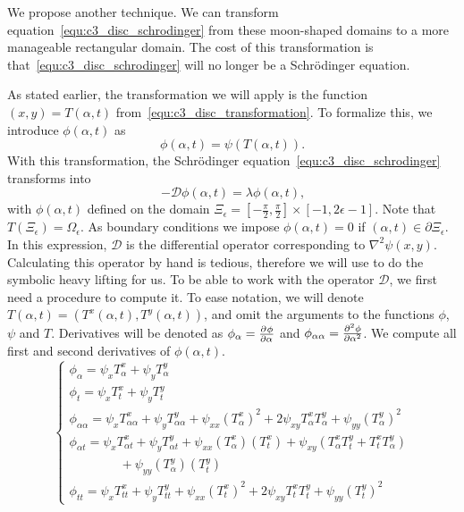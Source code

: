 We propose another technique. We can transform equation~\eqref{equ:c3_disc_schrodinger} from these moon-shaped domains to a more manageable rectangular domain. The cost of this transformation is that~\eqref{equ:c3_disc_schrodinger} will no longer be a Schrödinger equation.

As stated earlier, the transformation we will apply is the function $(x, y) = T(\alpha, t)$ from~\eqref{equ:c3_disc_transformation}. To formalize this, we introduce $\phi(\alpha, t)$ as
$$
  \phi(\alpha, t) = \psi(T(\alpha, t))\text{.}
$$
With this transformation, the Schrödinger equation~\eqref{equ:c3_disc_schrodinger} transforms into
\begin{equation}\label{equ:c3_disc_schrodinger_transformed}
  -\mathcal{D}\phi(\alpha, t) = \lambda\phi(\alpha, t)\text{,}
\end{equation}
with $\phi(\alpha, t)$ defined on the domain $\Xi_\epsilon = \left[-\frac{\pi}{2}, \frac{\pi}{2}\right] \times [-1, 2\epsilon - 1]$. Note that $T(\Xi_\epsilon) = \Omega_\epsilon$. As boundary conditions we impose $\phi(\alpha, t) = 0$ if $(\alpha, t) \in \partial\Xi_\epsilon$. In this expression, $\mathcal{D}$ is the differential operator corresponding to $\nabla^2\psi(x, y)$. Calculating this operator by hand is tedious, therefore we will use \sage{} to do the symbolic heavy lifting for us. To be able to work with the operator $\mathcal{D}$, we first need a procedure to compute it. To ease notation, we will denote $T(\alpha, t) = (T^{x}(\alpha, t), T^{y}(\alpha, t))$, and omit the arguments to the functions $\phi$, $\psi$ and $T$. Derivatives will be denoted as $\phi_\alpha = \pdv[]{\phi}{\alpha}$ and $\phi_{\alpha\alpha} = \pdv[2]{\phi}{\alpha}$. We compute all first and second derivatives of $\phi(\alpha, t)$.
\begin{equation}\label{equ:disc_transformation_derivatives}
  \begin{cases}
    \phi_\alpha = \psi_x T^x_\alpha + \psi_y T^y_\alpha                                                                                                                   \\
    \phi_t = \psi_x T^x_t + \psi_y T^y_t                                                                                                                                  \\
    \phi_{\alpha\alpha} = \psi_x T^x_{\alpha\alpha} + \psi_y T^y_{\alpha\alpha} + \psi_{xx} (T^x_\alpha)^2 + 2 \psi_{xy} T^x_\alpha T^y_\alpha + \psi_{yy} (T^y_\alpha)^2 \\
    \phi_{\alpha t} = \psi_x T^x_{\alpha t} + \psi_y T^y_{\alpha t} + \psi_{xx} (T^x_\alpha)(T^x_t) + \psi_{xy} \left(T^x_\alpha T^y_t + T^x_t T^y_\alpha \right)         \\
    \quad\quad\quad\quad {} + \psi_{yy} (T^y_\alpha)(T^y_t)                                                                                                               \\
    \phi_{tt} = \psi_x T^x_{tt} + \psi_y T^y_{tt} + \psi_{xx} (T^x_t)^2 + 2 \psi_{xy} T^x_t T^y_t + \psi_{yy} (T^y_t)^2
  \end{cases}
\end{equation}

